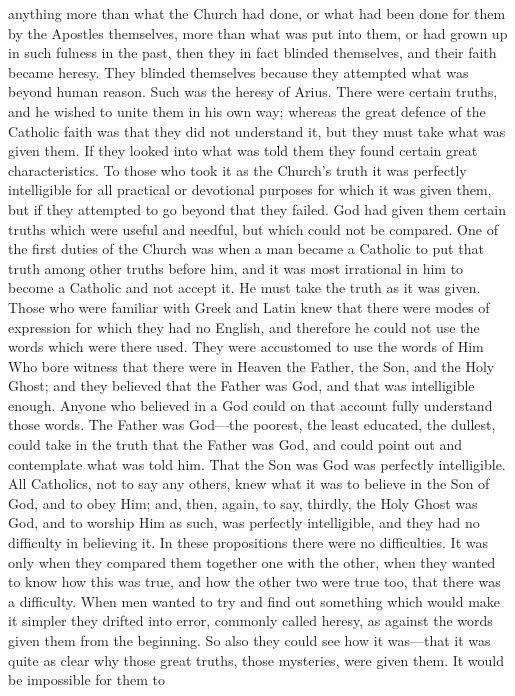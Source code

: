 anything more than what the Church had done, or what had been done for
them by the Apostles themselves, more than what was put into them, or
had grown up in such fulness in the past, then they in fact blinded
themselves, and their faith became heresy. They blinded themselves
because they attempted what was beyond human reason. Such was the
heresy of Arius. There were certain truths, and he wished to unite
them in his own way; whereas the great defence of the Catholic
faith was that they did not understand it, but they must take what was
given them. If they looked into what was told them they found certain
great characteristics. To those who took it as the Church's truth it
was perfectly intelligible for all practical or devotional purposes
for which it was given them, but if they attempted to go beyond that
they failed. God had given them certain truths which were useful and
needful, but which could not be compared. One of the first duties of
the Church was when a man became a Catholic to put that truth among
other truths before him, and it was most irrational in him to become a
Catholic and not accept it. He must take the truth as it was given.
Those who were familiar with Greek and Latin knew that there were
modes of expression for which they had no English, and therefore he
could not use the words which were there used. They were accustomed to
use the words of Him Who bore witness that there were in Heaven the
Father, the Son, and the Holy Ghost; and they believed that the Father
was God, and that was intelligible enough. Anyone who believed in a
God could on that account fully understand those words. The Father was
God—the poorest, the least educated, the dullest, could take in the
truth that the Father was God, and could point out and contemplate
what was told him. That the Son was God was perfectly intelligible.
All Catholics, not to say any others, knew what it was to believe in
the Son of God, and to obey Him; and, then, again, to say, thirdly,
the Holy Ghost was God, and to worship Him as such, was perfectly
intelligible, and they had no difficulty in believing it. In these
propositions there were no difficulties. It was only when they
compared them together one with the other, when they wanted to know
how this was true, and how the other two were true too, that there was
a difficulty. When men wanted to try and find out something which
would make it simpler they drifted into error, commonly called heresy,
as against the words given them from the beginning. So also they could
see how it was—that it was quite as clear why those great truths,
those mysteries, were given them. It would be impossible for them to
